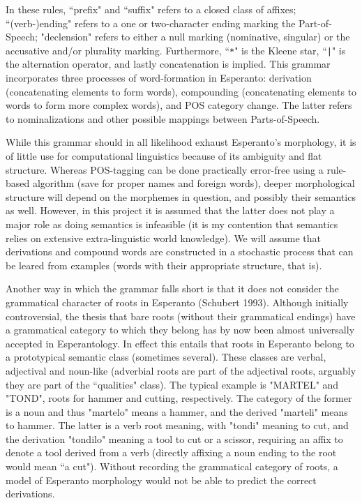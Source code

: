 \documentclass[10pt,a4paper]{article}
\begin{document}
In these rules, ``prefix" and ``suffix" refers to a closed class of affixes;
``(verb-)ending" refers to a one or two-character ending marking the
Part-of-Speech; "declension" refers to either a null marking (nominative,
singular) or the accusative and/or plurality marking. Furthermore,
``\texttt{*}" is the Kleene star, ``\texttt{|}" is the alternation operator,
and lastly concatenation is implied. This grammar incorporates three processes
of word-formation in Esperanto: derivation (concatenating elements to form
words), compounding (concatenating elements to words to form more complex
words), and POS category change.  The latter refers to nominalizations and
other possible mappings between Parts-of-Speech.

While this grammar should in all likelihood exhaust Esperanto's morphology, 
it is of little use for computational linguistics because of its ambiguity
and flat structure.  Whereas POS-tagging can be done practically error-free
using a rule-based algorithm (save for proper names and foreign words), deeper
morphological structure will depend on the morphemes in question, and possibly
their semantics as well. However, in this project it is assumed that the latter
does not play a major role as doing semantics is infeasible (it is my
contention that semantics relies on extensive extra-linguistic world
knowledge). We will assume that derivations and compound words are constructed
in a stochastic process that can be leared from examples (words with their
appropriate structure, that is).

Another way in which the grammar falls short is that it does not consider the
grammatical character of roots in Esperanto (Schubert 1993). Although initially
controversial, the thesis that bare roots (without their grammatical endings)
have a grammatical category to which they belong has by now been almost
universally accepted in Esperantology. In effect this entails that roots in
Esperanto belong to a prototypical semantic class (sometimes several).  These
classes are verbal, adjectival and noun-like (adverbial roots are part of the
adjectival roots, arguably they are part of the ``qualities" class). The
typical example is "MARTEL" and "TOND", roots for hammer and cutting,
respectively. The category of the former is a noun and thus "martelo" means a
hammer, and the derived "marteli" means to hammer. The latter is a verb root
meaning, with "tondi" meaning to cut, and the derivation "tondilo" meaning a
tool to cut or a scissor, requiring an affix to denote a tool derived from a
verb (directly affixing a noun ending to the root would mean ``a cut"). Without
recording the grammatical category of roots, a model of Esperanto morphology
would not be able to predict the correct derivations.
\end{document}
